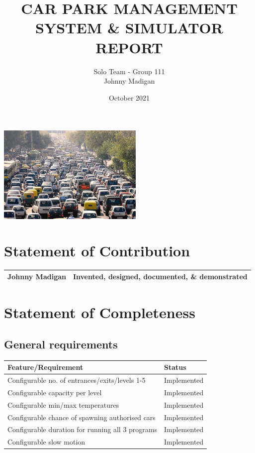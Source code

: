 \documentclass[a4paper]{article}
\title{CAR PARK MANAGEMENT SYSTEM \& SIMULATOR REPORT\vspace{-3ex}}
\author{Solo Team - Group 111\\Johnny Madigan} %
\date{\vspace{-3ex}October 2021\vspace{20ex}}
\begin{document}
\maketitle
\begin{center}
\includegraphics[width=7cm]{report-img/title-pic.jpg}
\end{center}
\newpage
\tableofcontents
\newpage

\section{Statement of Contribution}\label{sec:contribution}

\begin{tabular}{ |l|l| }
\hline
 \cellcolor{gray!10}\textbf{Johnny Madigan} & Invented, designed, documented, \& demonstrated\\
\hline
\end{tabular}

\section{Statement of Completeness}\label{sec:completeness}

\subsection{General requirements}
\begin{tabular}{|m{24.7em}|l|}
  \hline
  \cellcolor{gray!10} \textbf{Feature\slash Requirement} & \cellcolor{gray!10} \textbf{Status}\\
  \hline
  Configurable no. of entrances/exits/levels 1-5 & \cellcolor{green!40}Implemented\\
  \hline
  Configurable capacity per level & \cellcolor{green!40}Implemented\\
  \hline
  Configurable min/max temperatures & \cellcolor{green!40}Implemented\\
  \hline
  Configurable chance of spawning authorised cars & \cellcolor{green!40}Implemented\\
  \hline
  Configurable duration for running all 3 programs & \cellcolor{green!40}Implemented\\
  \hline
  Configurable slow motion & \cellcolor{green!40}Implemented\\
  \hline
\end{tabular}
\end{document}
